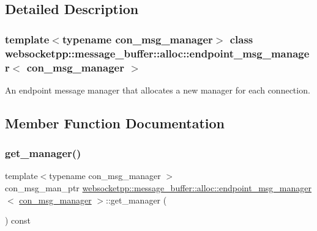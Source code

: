 \subsection{Detailed Description}
\subsubsection*{template$<$typename con\+\_\+msg\+\_\+manager$>$\newline
class websocketpp\+::message\+\_\+buffer\+::alloc\+::endpoint\+\_\+msg\+\_\+manager$<$ con\+\_\+msg\+\_\+manager $>$}

An endpoint message manager that allocates a new manager for each connection. 

\subsection{Member Function Documentation}
\mbox{\label{classwebsocketpp_1_1message__buffer_1_1alloc_1_1endpoint__msg__manager_a58c3cece7c5122cfabb4f0071cd9ced4}} 
\subsubsection{\texorpdfstring{get\+\_\+manager()}{get\_manager()}\hspace{0.1cm}{\footnotesize\ttfamily [1/2]}}
{\footnotesize\ttfamily template$<$typename con\+\_\+msg\+\_\+manager $>$ \\
con\+\_\+msg\+\_\+man\+\_\+ptr \mbox{\hyperlink{classwebsocketpp_1_1message__buffer_1_1alloc_1_1endpoint__msg__manager}{websocketpp\+::message\+\_\+buffer\+::alloc\+::endpoint\+\_\+msg\+\_\+manager}}$<$ \mbox{\hyperlink{classwebsocketpp_1_1message__buffer_1_1alloc_1_1con__msg__manager}{con\+\_\+msg\+\_\+manager}} $>$\+::get\+\_\+manager (\begin{DoxyParamCaption}{ }\end{DoxyParamCaption}) const\hspace{0.3cm}{\ttfamily [inline]}}



